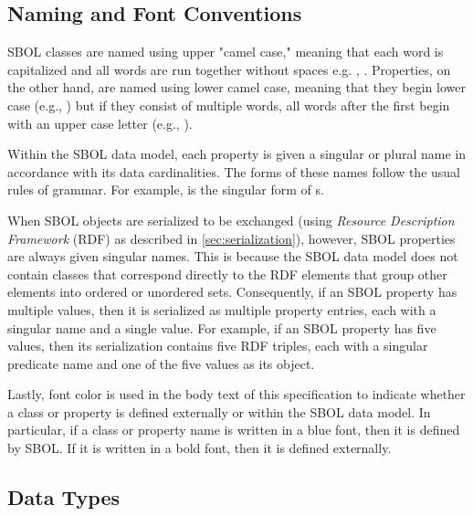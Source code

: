 \subsection{Naming and Font Conventions}
\label{sec:nameconventions}

SBOL classes are named using upper "camel case," meaning that each word is capitalized and all words are run together without spaces e.g. , .  
Properties, on the other hand, are named using lower camel case, meaning that they begin lower case (e.g., ) but if they consist of multiple words, all words after the first begin with an upper case letter (e.g., ).

Within the SBOL data model, each property is given a singular or plural name in accordance with its data cardinalities. The forms of these names follow the usual rules of grammar. For example,  is the singular form of s. 

When SBOL objects are serialized to be exchanged (using \emph{Resource Description Framework} (RDF) as described in \ref{sec:serialization}), however, SBOL properties are always given singular names. This is because the SBOL data model does not contain classes that correspond directly to the RDF elements that group other elements into ordered or unordered sets. Consequently, if an SBOL property has multiple values, then it is serialized as multiple property entries, each with a singular name and a single value.
For example, if an SBOL property has five values, then its serialization contains five RDF triples, each with a singular predicate name and one of the five values as its object.

Lastly, font color is used in the body text of this specification to indicate whether a class or property is defined externally or within the SBOL data model. In particular, if a class or property name is written in a blue font, then it is defined by SBOL. If it is written in a bold font, then it is defined externally.

\subsection{Data Types}
\label{sec:datatypes}



